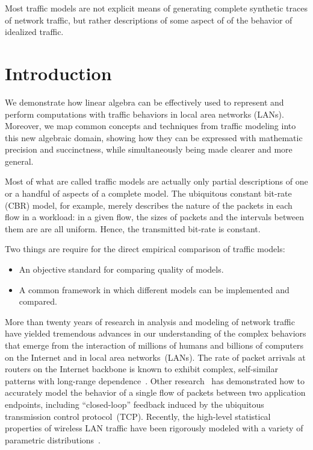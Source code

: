 \documentclass[conference]{IEEEtran}
\newcommand{\caps}[1]{{\small{#1}}}
\begin{document}
Most traffic models are not explicit means of generating complete synthetic traces of network traffic, but rather descriptions of some aspect of of the behavior of idealized traffic.

\section{Introduction}\label{sec:intro}

We demonstrate how linear algebra can be effectively used to represent and perform computations with traffic behaviors in local area networks (\caps{LAN}s). Moreover, we map common concepts and techniques from traffic modeling into this new algebraic domain, showing how they can be expressed with mathematic precision and succinctness, while simultaneously being made clearer and more general. 

Most of what are called traffic models are actually only partial descriptions of one or a handful of aspects of a complete model. The ubiquitous constant bit-rate (\caps{CBR}) model, for example, merely describes the nature of the packets in each flow in a workload: in a given flow, the sizes of packets and the intervals between them are are all uniform. Hence, the transmitted bit-rate is constant.

Two things are require for the direct empirical comparison of traffic models:
\begin{itemize}
\item An objective standard for comparing quality of models.
\item A common framework in which different models can be implemented and compared.
\end{itemize}

More than twenty years of research in analysis and modeling of network traffic have yielded tremendous advances in our understanding of the complex behaviors that emerge from the interaction of millions of humans and billions of computers on the Internet and in local area networks~(\caps{LAN}s). The rate of packet arrivals at routers on the Internet backbone is known to exhibit complex, self-similar patterns with long-range dependence~\cite{Paxson95,Paxson96,Willinger98}. Other research~\cite{Hernandez06:dissertation} has demonstrated how to accurately model the behavior of a single flow of packets between two application endpoints, including ``closed-loop'' feedback induced by the ubiquitous transmission control protocol~(\caps{TCP}). Recently, the high-level statistical properties of wireless \caps{LAN} traffic have been rigorously modeled with a variety of parametric distributions~\cite{Hernandez06:wlan-traffic}.
\end{document}
